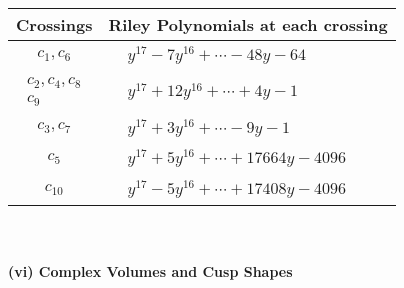 \documentclass[1p]{elsarticle_modified}
\theoremstyle{definition}
\begin{document}
\begin{tabular}{m{50pt}|m{274pt}}
Crossings & \hspace{64pt}Riley Polynomials at each crossing \\
\hline $$\begin{aligned}c_{1},c_{6}\end{aligned}$$&$\begin{aligned}
&y^{17}-7 y^{16}+\cdots-48 y-64
\end{aligned}$\\
\hline $$\begin{aligned}c_{2},c_{4},c_{8}\\c_{9}\end{aligned}$$&$\begin{aligned}
&y^{17}+12 y^{16}+\cdots+4 y-1
\end{aligned}$\\
\hline $$\begin{aligned}c_{3},c_{7}\end{aligned}$$&$\begin{aligned}
&y^{17}+3 y^{16}+\cdots-9 y-1
\end{aligned}$\\
\hline $$\begin{aligned}c_{5}\end{aligned}$$&$\begin{aligned}
&y^{17}+5 y^{16}+\cdots+17664 y-4096
\end{aligned}$\\
\hline $$\begin{aligned}c_{10}\end{aligned}$$&$\begin{aligned}
&y^{17}-5 y^{16}+\cdots+17408 y-4096
\end{aligned}$\\
\hline
\end{tabular}\\~\\
\newpage\flushleft \textbf{(vi) Complex Volumes and Cusp Shapes}
\end{document}
